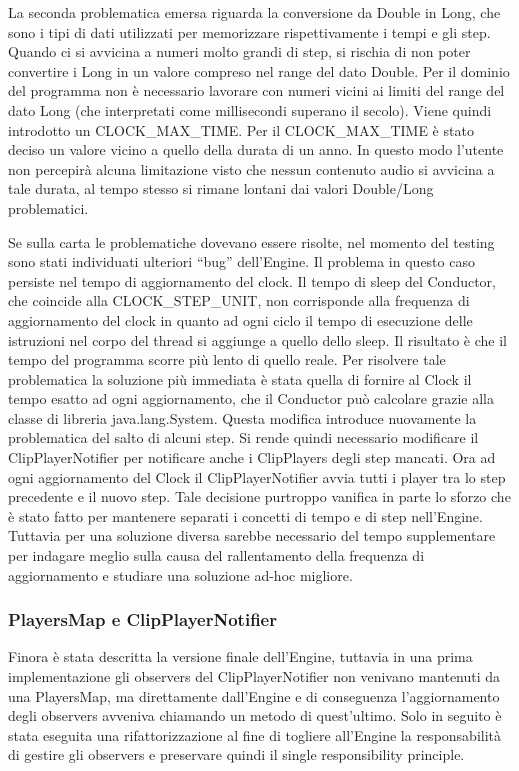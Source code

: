 \documentclass[a4paper,12pt]{report}
\begin{document}
La seconda problematica emersa riguarda la conversione da Double in Long, che sono i tipi di dati utilizzati per memorizzare rispettivamente i tempi e gli step.
Quando ci si avvicina a numeri molto grandi di step, si rischia di non poter convertire i Long in un valore compreso nel range del dato Double. Per il dominio del programma non è necessario lavorare con numeri vicini ai limiti del range del dato Long (che interpretati come millisecondi superano il secolo). Viene quindi introdotto un CLOCK\_MAX\_TIME. 
Per il CLOCK\_MAX\_TIME è stato deciso un valore vicino a quello della durata di un anno. In questo modo l’utente non percepirà alcuna limitazione visto che nessun contenuto audio si avvicina a tale durata, al tempo stesso si rimane lontani dai valori Double/Long problematici.

Se sulla carta le problematiche dovevano essere risolte, nel momento del testing sono stati individuati ulteriori “bug” dell’Engine.
Il problema in questo caso persiste nel tempo di aggiornamento del clock. 
Il tempo di sleep del Conductor, che coincide alla CLOCK\_STEP\_UNIT, non corrisponde alla frequenza di aggiornamento del clock in quanto ad ogni ciclo il tempo di esecuzione delle istruzioni nel corpo del thread si aggiunge a quello dello sleep. Il risultato è che il tempo del programma scorre più lento di quello reale.
Per risolvere tale problematica la soluzione più immediata è stata quella di fornire al Clock il tempo esatto ad ogni aggiornamento, che il Conductor può calcolare grazie alla classe di libreria java.lang.System.
Questa modifica introduce nuovamente la problematica del salto di alcuni step. Si rende quindi necessario modificare il ClipPlayerNotifier per notificare anche i ClipPlayers degli step mancati. Ora ad ogni aggiornamento del Clock il ClipPlayerNotifier avvia tutti i player tra lo step precedente e il nuovo step.
Tale decisione purtroppo vanifica in parte lo sforzo che è stato fatto per mantenere separati i concetti di tempo e di step nell’Engine. Tuttavia per una soluzione diversa sarebbe necessario del tempo supplementare per indagare meglio sulla causa del rallentamento della frequenza di aggiornamento e studiare una soluzione ad-hoc migliore.
\endsubsubsection
\subsubsection{PlayersMap e ClipPlayerNotifier}
Finora è stata descritta la versione finale dell’Engine, tuttavia in una prima implementazione gli observers del ClipPlayerNotifier non venivano mantenuti da una PlayersMap, ma direttamente dall’Engine e di conseguenza l’aggiornamento degli observers avveniva chiamando un metodo di quest'ultimo. 
Solo in seguito è stata eseguita una rifattorizzazione al fine di togliere all’Engine la responsabilità di gestire gli observers e preservare quindi il single responsibility principle.
\end{document}
